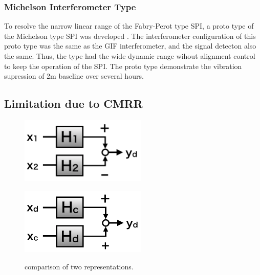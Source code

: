 \subsubsection{Michelson Interferometer Type}
To resolve the narrow linear range of the Fabry-Perot type SPI, a proto type of the Michelson type SPI was developed \cite{Numata2008interferometric}. The interferometer configuration of this proto type was the same as the GIF interferometer, and the signal detecton also the same. Thus, the type had the wide dynamic range wihout alignment control to keep the operation of the SPI. The proto type demonstrate the vibration supression of 2m baseline over several hours.

\subsection{Limitation due to CMRR}\label{sec532}
\begin{figure}[h]
  \begin{minipage}[t]{0.5\hsize}
    \centering
    \includegraphics[width=6cm]{./img_chap5/img510a.png}
     \label{img:img510a}
  \end{minipage}
  \begin{minipage}[t]{0.5\hsize}
    \centering
    \includegraphics[width=6cm]{./img_chap5/img510b.png}
     \label{img:img510b}
  \end{minipage}
  \caption{comparison of two representations.}
\end{figure}

